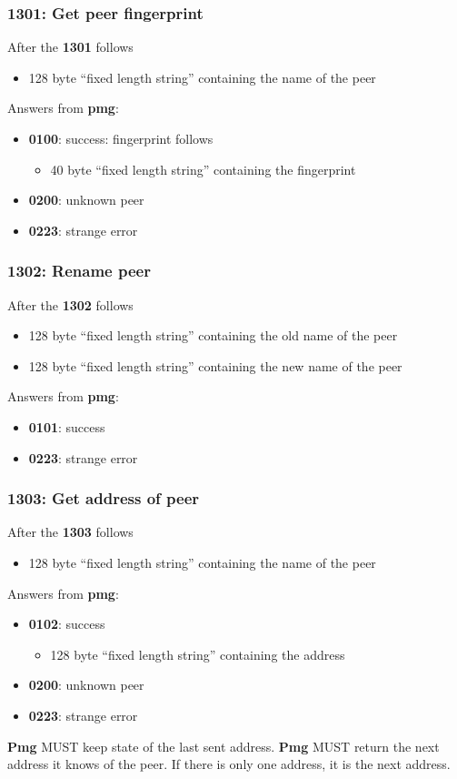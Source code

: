 \documentclass[12pt,a4paper]{book}
\begin{document}
\subsubsection{1301: Get peer fingerprint}
After the \textbf{1301} follows
\begin{itemize}
\item 128 byte "`fixed length string"' containing the name of the peer
\end{itemize}
Answers from \textbf{pmg}:
\begin{itemize}
\item \textbf{0100}: success: fingerprint follows
\begin{itemize}
\item 40 byte "`fixed length string"' containing the fingerprint
\end{itemize}
\item \textbf{0200}: unknown peer
\item \textbf{0223}: strange error
\end{itemize}
\subsubsection{1302: Rename peer}
After the \textbf{1302} follows
\begin{itemize}
\item 128 byte "`fixed length string"' containing the old name of the peer
\item 128 byte "`fixed length string"' containing the new name of the peer
\end{itemize}
Answers from \textbf{pmg}:
\begin{itemize}
\item \textbf{0101}: success
\item \textbf{0223}: strange error
\end{itemize}
\subsubsection{1303: Get address of peer}
After the \textbf{1303} follows
\begin{itemize}
\item 128 byte "`fixed length string"' containing the name of the peer
\end{itemize}
Answers from \textbf{pmg}:
\begin{itemize}
\item \textbf{0102}: success
\begin{itemize}
\item 128 byte "`fixed length string"' containing the address
\end{itemize}
\item \textbf{0200}: unknown peer
\item \textbf{0223}: strange error
\end{itemize}
\textbf{Pmg} MUST keep state of the last sent address.
\textbf{Pmg} MUST return the next address it knows of the peer.
If there is only one address, it is the next address.
\end{document}

